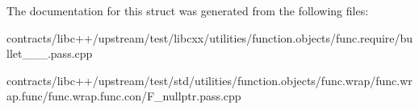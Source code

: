 The documentation for this struct was generated from the following files\+:\begin{DoxyCompactItemize}
\item 
contracts/libc++/upstream/test/libcxx/utilities/function.\+objects/func.\+require/bullet\+\_\+\_\+\_.\+pass.\+cpp\item 
contracts/libc++/upstream/test/std/utilities/function.\+objects/func.\+wrap/func.\+wrap.\+func/func.\+wrap.\+func.\+con/F\+\_\+nullptr.\+pass.\+cpp\end{DoxyCompactItemize}
